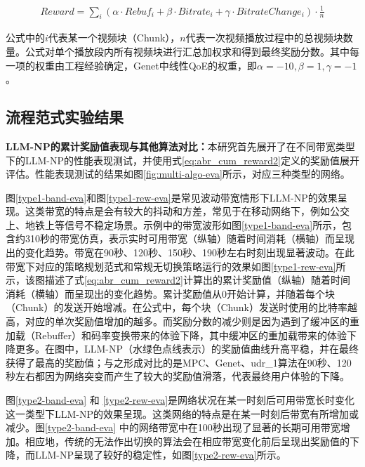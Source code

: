 \begin{equation}
\begin{aligned}
    Reward = \sum_i(\alpha \cdot Rebuf_i + \beta \cdot Bitrate_i + \gamma \cdot BitrateChange_i) \cdot \frac{1}{n}
\end{aligned}
\label{eq:abr_cum_reward2}
\end{equation}

公式中的$i$代表某一个视频块（Chunk），$n$代表一次视频播放过程中的总视频块数量。公式对单个播放段内所有视频块进行汇总加权求和得到最终奖励分数。其中每一项的权重由工程经验确定，Genet\cite{xia2022genet}中线性QoE的权重，即$\alpha = -10, \beta = 1, \gamma = -1$。

\subsection{流程范式实验结果}
\textbf{LLM-NP的累计奖励值表现与其他算法对比：}本研究首先展开了在不同带宽类型下的LLM-NP的性能表现测试，并使用式\eqref{eq:abr_cum_reward2}定义的奖励值展开评估。性能表现测试的结果如图\ref{fig:multi-algo-eva}所示，对应三种类型的网络。


图\ref{type1-band-eva}和图\ref{type1-rew-eva}是常见波动带宽情形下LLM-NP的效果呈现。这类带宽的特点是会有较大的抖动和方差，常见于在移动网络下，例如公交上、地铁上等信号不稳定场景。示例中的带宽波形如图\ref{type1-band-eva}所示，包含约310秒的带宽仿真，表示实时可用带宽（纵轴）随着时间消耗（横轴）而呈现出的变化趋势。带宽在90秒、120秒、150秒、190秒左右时刻出现显著波动。在此带宽下对应的策略规划范式和常规无切换策略运行的效果如图\ref{type1-rew-eva}所示，该图描述了式\eqref{eq:abr_cum_reward2}计算出的累计奖励值（纵轴）随着时间消耗（横轴）而呈现出的变化趋势。累计奖励值从0开始计算，并随着每个块（Chunk）的发送开始增减。在公式中，每个块（Chunk）发送时使用的比特率越高，对应的单次奖励值增加的越多。而奖励分数的减少则是因为遇到了缓冲区的重加载（Rebuffer）和码率变换带来的体验下降，其中缓冲区的重加载带来的体验下降更多。在图中，LLM-NP（水绿色点线表示）的奖励值曲线升高平稳，并在最终获得了最高的奖励值；与之形成对比的是MPC、Genet、udr\_1算法在90秒、120秒左右都因为网络突变而产生了较大的奖励值滑落，代表最终用户体验的下降。

图\ref{type2-band-eva} 和 \ref{type2-rew-eva}是网络状况在某一时刻后可用带宽长时变化这一类型下LLM-NP的效果呈现。这类网络的特点是在某一时刻后带宽有所增加或减少。图\ref{type2-band-eva} 中的网络带宽中在100秒出现了显著的长期可用带宽增加。相应地，传统的无法作出切换的算法会在相应带宽变化前后呈现出奖励值的下降，而LLM-NP呈现了较好的稳定性，如图\ref{type2-rew-eva}所示。

